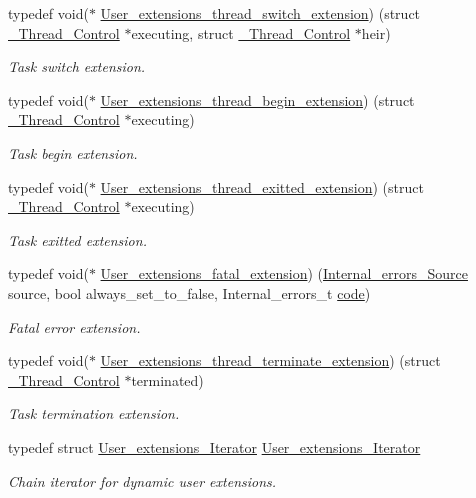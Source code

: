 \begin{DoxyCompactItemize}
typedef void($\ast$ \mbox{\hyperlink{group__RTEMSScoreUserExt_gac8250042e8749b455941bf4085d09fc5}{User\+\_\+extensions\+\_\+thread\+\_\+switch\+\_\+extension}}) (struct \mbox{\hyperlink{struct__Thread__Control}{\+\_\+\+Thread\+\_\+\+Control}} $\ast$executing, struct \mbox{\hyperlink{struct__Thread__Control}{\+\_\+\+Thread\+\_\+\+Control}} $\ast$heir)
\begin{DoxyCompactList}\small\item\em Task switch extension. \end{DoxyCompactList}\item 
typedef void($\ast$ \mbox{\hyperlink{group__RTEMSScoreUserExt_ga4beea4d5417558969b343317683ab7c6}{User\+\_\+extensions\+\_\+thread\+\_\+begin\+\_\+extension}}) (struct \mbox{\hyperlink{struct__Thread__Control}{\+\_\+\+Thread\+\_\+\+Control}} $\ast$executing)
\begin{DoxyCompactList}\small\item\em Task begin extension. \end{DoxyCompactList}\item 
typedef void($\ast$ \mbox{\hyperlink{group__RTEMSScoreUserExt_ga876d6c2dd2ba0083ea94332a9438a91b}{User\+\_\+extensions\+\_\+thread\+\_\+exitted\+\_\+extension}}) (struct \mbox{\hyperlink{struct__Thread__Control}{\+\_\+\+Thread\+\_\+\+Control}} $\ast$executing)
\begin{DoxyCompactList}\small\item\em Task exitted extension. \end{DoxyCompactList}\item 
typedef void($\ast$ \mbox{\hyperlink{group__RTEMSScoreUserExt_gab9b016d654a82fef8666c465c2736a05}{User\+\_\+extensions\+\_\+fatal\+\_\+extension}}) (\mbox{\hyperlink{group__RTEMSScoreIntErr_ga878b4de77df7d0b83d19609d4de42c26}{Internal\+\_\+errors\+\_\+\+Source}} source, bool always\+\_\+set\+\_\+to\+\_\+false, Internal\+\_\+errors\+\_\+t \mbox{\hyperlink{structcode}{code}})
\begin{DoxyCompactList}\small\item\em Fatal error extension. \end{DoxyCompactList}\item 
typedef void($\ast$ \mbox{\hyperlink{group__RTEMSScoreUserExt_gab2e511a997080ca8050ac25a3bece8e4}{User\+\_\+extensions\+\_\+thread\+\_\+terminate\+\_\+extension}}) (struct \mbox{\hyperlink{struct__Thread__Control}{\+\_\+\+Thread\+\_\+\+Control}} $\ast$terminated)
\begin{DoxyCompactList}\small\item\em Task termination extension. \end{DoxyCompactList}\item 
typedef struct \mbox{\hyperlink{structUser__extensions__Iterator}{User\+\_\+extensions\+\_\+\+Iterator}} \mbox{\hyperlink{group__RTEMSScoreUserExt_ga990aa1088e4be8ec19d73426b18f0e48}{User\+\_\+extensions\+\_\+\+Iterator}}
\begin{DoxyCompactList}\small\item\em Chain iterator for dynamic user extensions. \end{DoxyCompactList}\end{DoxyCompactItemize}
